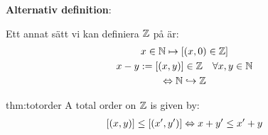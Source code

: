 \par\bigskip
\noindent\textbf{Alternativ definition}:\par
\noindent Ett annat sätt vi kan definiera $\mathbb{Z}$ på är:
\begin{equation*}
  \begin{gathered}
    x\in\mathbb{N}\mapsto [(x,0)\in\mathbb{Z}]\\
    x-y:=[(x,y)]\in\mathbb{Z}\quad\forall x,y\in\mathbb{N}\\
    \Leftrightarrow \mathbb{N}\hookrightarrow\mathbb{Z}
  \end{gathered}
\end{equation*}
\par\bigskip
\begin{theo}{thm:totorder}
  A total order on $\mathbb{Z}$ is given by:
  \begin{equation*}
    \begin{gathered}
      [(x,y)]\leq[(x^{\prime},y^{\prime})]\Lrarr x+y^{\prime}\leq x^{\prime}+y\\
    \end{gathered}
  \end{equation*}
\end{theo}
\par\bigskip
